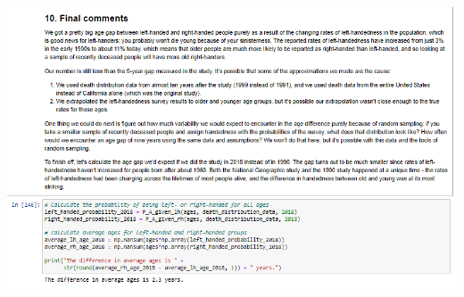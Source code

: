 \documentclass{article}
\begin{document}
\vspace{0.5cm}

        \begin{center}
            \includegraphics[height=250pt]{10.png}\\
        \end{center}
\vspace{0.5cm}
\end{document}
